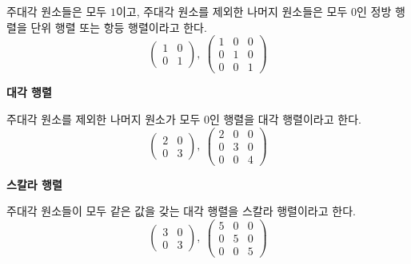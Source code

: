 \begin{tcolorbox}[colback = white, colframe = Definition, title = \textmd{정의: 단위 행렬(항등 행렬)}]
    주대각 원소들은 모두 $1$이고, 주대각 원소를 제외한 나머지 원소들은 모두 $0$인 정방 행렬을 단위 행렬 또는 항등 행렬이라고 한다.
    \[ \begin{pmatrix} 1 & 0 \\ 0 & 1 \end{pmatrix}, \ 
    \begin{pmatrix} 1 & 0 & 0 \\ 0 & 1 & 0 \\ 0 & 0 & 1 \end{pmatrix} \]
\end{tcolorbox}

\bigskip
\begin{flushleft}
    {\textcolor{subheader}{{\LARGE\textbf{대각 행렬}}}}
\end{flushleft}

\begin{tcolorbox}[colback = white, colframe = Definition, title = \textmd{정의: 대각 행렬}]
    주대각 원소를 제외한 나머지 원소가 모두 $0$인 행렬을 대각 행렬이라고 한다. 
    \[ \begin{pmatrix} 2 & 0 \\ 0 & 3 \end{pmatrix}, \ 
    \begin{pmatrix} 2 & 0 & 0 \\ 0 & 3 & 0 \\ 0 & 0 & 4 \end{pmatrix} \]
\end{tcolorbox}


\bigskip
\begin{flushleft}
    {\textcolor{subheader}{{\LARGE\textbf{스칼라 행렬}}}}
\end{flushleft}

\begin{tcolorbox}[colback = white, colframe = Definition, title = \textmd{정의: 스칼라 행렬}]
    주대각 원소들이 모두 같은 값을 갖는 대각 행렬을 스칼라 행렬이라고 한다.
    \[ \begin{pmatrix} 3 & 0 \\ 0 & 3 \end{pmatrix}, \ 
    \begin{pmatrix} 5 & 0 & 0 \\ 0 & 5 & 0 \\ 0 & 0 & 5 \end{pmatrix} \]
\end{tcolorbox}


